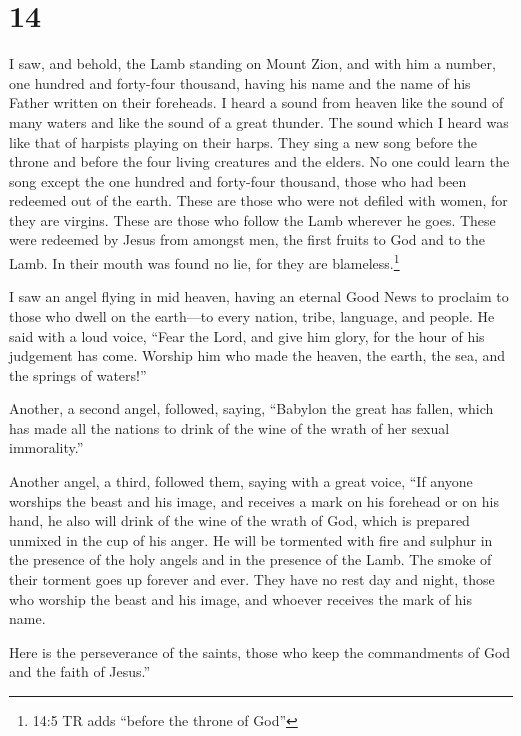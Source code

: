 \hypertarget{section-13}{%
\section{14}\label{section-13}}

 I saw, and behold, the Lamb standing on Mount Zion, and
with him a number, one hundred and forty-four thousand, having his name
and the name of his Father written on their foreheads.  I
heard a sound from heaven like the sound of many waters and like the
sound of a great thunder. The sound which I heard was like that of
harpists playing on their harps.  They sing a new song
before the throne and before the four living creatures and the elders.
No one could learn the song except the one hundred and forty-four
thousand, those who had been redeemed out of the earth. 
These are those who were not defiled with women, for they are virgins.
These are those who follow the Lamb wherever he goes. These were
redeemed by Jesus from amongst men, the first fruits to God and to the
Lamb.  In their mouth was found no lie, for they are
blameless.\footnote{14:5 TR adds ``before the throne of God''}

 I saw an angel flying in mid heaven, having an eternal Good
News to proclaim to those who dwell on the earth---to every nation,
tribe, language, and people.  He said with a loud voice,
``Fear the Lord, and give him glory, for the hour of his judgement has
come. Worship him who made the heaven, the earth, the sea, and the
springs of waters!''

 Another, a second angel, followed, saying, ``Babylon the
great has fallen, which has made all the nations to drink of the wine of
the wrath of her sexual immorality.''

 Another angel, a third, followed them, saying with a great
voice, ``If anyone worships the beast and his image, and receives a mark
on his forehead or on his hand,  he also will drink of the
wine of the wrath of God, which is prepared unmixed in the cup of his
anger. He will be tormented with fire and sulphur in the presence of the
holy angels and in the presence of the Lamb.  The smoke of
their torment goes up forever and ever. They have no rest day and night,
those who worship the beast and his image, and whoever receives the mark
of his name.

 Here is the perseverance of the saints, those who keep the
commandments of God and the faith of Jesus.''

